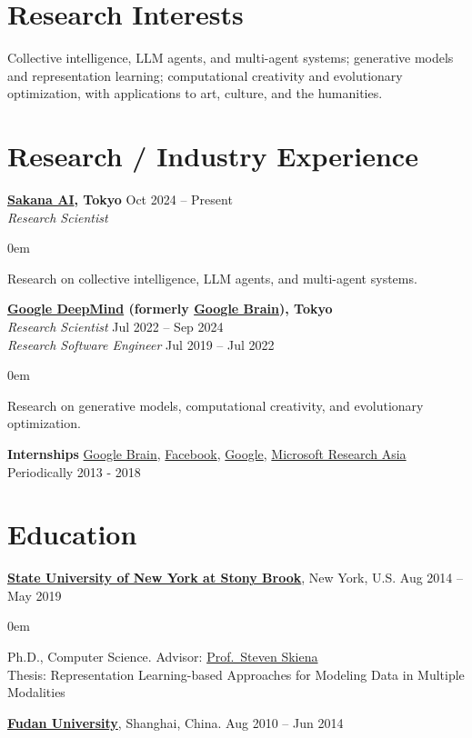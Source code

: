 \documentclass[line,margin]{cv}
\makeatletter
\newenvironment{block}
{
  \begin{addmargin}[2em]{0em}%
}
{
  \end{addmargin}
}
\newcommand{\SUNY}{\href{http://www.stonybrook.edu/}{State University of New York at Stony Brook}}
\newcommand{\Sakana}{\href{https://sakana.ai/}{Sakana AI}}
\newcommand{\Google}{\href{https://www.google.com/}{Google}}
\newcommand{\GoogleBrain}{\href{http://research.google.com/teams/brain/}{Google Brain}}
\newcommand{\GoogleDeepMind}{\href{https://www.deepmind.com/}{Google DeepMind}}
\newcommand{\Facebook}{\href{https://www.facebook.com/}{Facebook}}
\newcommand{\Fudan}{\href{https://www.fudan.edu.cn/en/}{Fudan University}}
\newcommand{\MyWebsite}{\href{https://alantian.net}{alantian.net}}
\newcommand{\MyMail}{\href{mailto:alan.yt.tian@gmail.com}{\nolinkurl{alan.yt.tian@gmail.com}}}
\newcommand{\MSRA}{\href{http://research.microsoft.com/en-us/labs/asia/default.aspx}{Microsoft Research Asia}}
\newcommand{\Skiena}{\href{https://www3.cs.stonybrook.edu/~skiena/}{Prof.\ Steven Skiena}}
\makeatother
\begin{document}

\address{Research Scientist \textbullet{} \Sakana{}  / \MyMail{} / \MyWebsite}

\begin{resume}

\section{Research Interests}
  Collective intelligence, LLM agents, and multi-agent systems; generative models and representation learning; computational creativity and evolutionary optimization, with applications to art, culture, and the humanities.

\section{Research / Industry Experience}

  {\bf \Sakana{}, Tokyo} \hfill Oct 2024 -- Present\\
  {\itshape Research Scientist}
  \begin{block}
    Research on collective intelligence, LLM agents, and multi-agent systems.
  \end{block}

  {\bf \GoogleDeepMind{} (formerly \GoogleBrain), Tokyo}\\
  {\itshape Research Scientist} \hfill Jul 2022 -- Sep 2024\\
  {\itshape Research Software Engineer} \hfill Jul 2019 -- Jul 2022
  \begin{block}
    Research on generative models, computational creativity, and evolutionary optimization.
  \end{block}

  {\bf Internships} \GoogleBrain{},  \Facebook{}, \Google{}, \MSRA{} \hfill Periodically 2013 - 2018

\section{Education}

  {\bf \SUNY}, New York, U.S. \hfill Aug 2014 -- May 2019
  \begin{block}
    Ph.D., Computer Science. Advisor: \Skiena{} \\
    Thesis: Representation Learning-based Approaches for Modeling Data in Multiple Modalities
  \end{block}

  {\bf \Fudan}, Shanghai, China. \hfill Aug 2010 -- Jun 2014


\end{resume}
\end{document}
